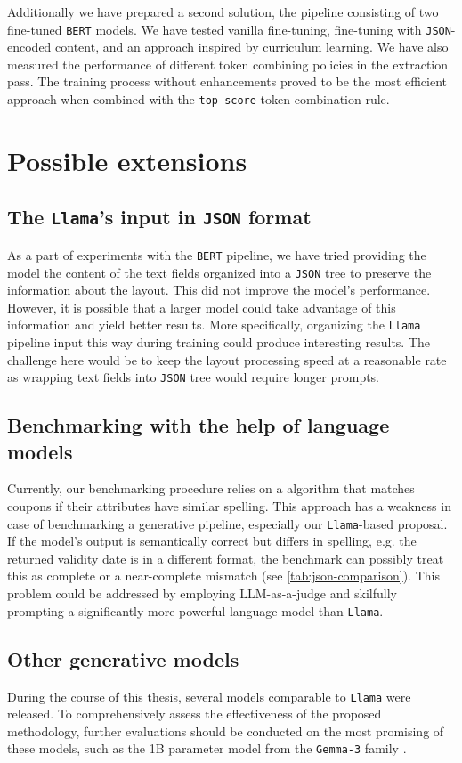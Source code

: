 \documentclass[licencjacka,en]{pracamgr}
\begin{document}
Additionally we have prepared a second solution, the pipeline consisting of two fine-tuned \texttt{BERT} models. We have tested vanilla fine-tuning, fine-tuning with \texttt{JSON}-encoded content, and an approach inspired by curriculum learning. We have also measured the performance of different token combining policies in the extraction pass. The training process without enhancements proved to be the most efficient approach when combined with the \texttt{top-score} token combination rule.
\section{Possible extensions}
\subsection{The \texttt{Llama}'s input in \texttt{JSON} format}
As a part of experiments with the \texttt{BERT} pipeline, we have tried providing the model the content of the text fields organized into a \texttt{JSON} tree to preserve the information about the layout. This did not improve the model's performance. However, it is possible that a larger model could take advantage of this information and yield better results. More specifically, organizing the \texttt{Llama} pipeline input this way during training could produce interesting results. The challenge here would be to keep the layout processing speed at a reasonable rate as wrapping text fields into \texttt{JSON} tree would require longer prompts.
\subsection{Benchmarking with the help of language models}
Currently, our benchmarking procedure relies on a algorithm that matches coupons if their attributes have similar spelling. This approach has a weakness in case of benchmarking a generative pipeline, especially our \texttt{Llama}-based proposal. If the model's output is semantically correct but differs in spelling, e.g. the returned validity date is in a different format, the benchmark can possibly treat this as complete or a near-complete mismatch (see \ref{tab:json-comparison}). This problem could be addressed by employing LLM-as-a-judge and skilfully prompting a significantly more powerful language model than \texttt{Llama}.
\subsection{Other generative models}
During the course of this thesis, several models comparable to \texttt{Llama} were released. To comprehensively assess the effectiveness of the proposed methodology, further evaluations should be conducted on the most promising of these models, such as the 1B parameter model from the \texttt{Gemma-3} family \cite{gemmateam2025gemma3technicalreport}.
\end{document}
